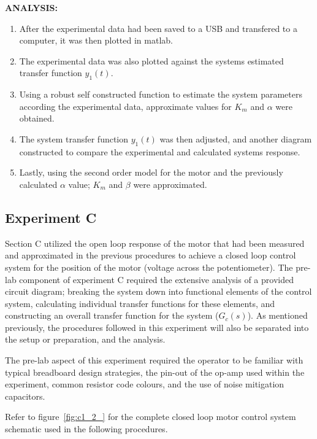 \documentclass[11pt,a4paper]{article}
\begin{document}
\textbf{ANALYSIS:}
\begin{enumerate}
  \item After the experimental data had been saved to a USB and transfered to a computer, it was then plotted in matlab.
  \item The experimental data was also plotted against the systems estimated transfer function $y_1(t)$. 
  \item Using a robust self constructed function to estimate the system parameters according the experimental data, approximate values for $K_m$ and $\alpha$ were obtained. 
  \item The system transfer function $y_1(t)$ was then adjusted, and another diagram constructed to compare the experimental and calculated systems response.
  \item Lastly, using the second order model for the motor and the previously calculated $\alpha$ value; $K_m$ and $\beta$ were approximated. 

\end{enumerate} 


\pagebreak
\subsection{Experiment C}
Section C utilized the open loop response of the motor that had been measured and approximated in the previous procedures to achieve a closed loop control system for the position of the motor (voltage across the potentiometer). The pre-lab component of experiment C required the extensive analysis of a provided circuit diagram; breaking the system down into functional elements of the control system, calculating individual transfer functions for these elements, and constructing an overall transfer function for the system ($G_c(s)$). As mentioned previously, the procedures followed in this experiment will also be separated into the setup or preparation, and the analysis. 

The pre-lab aspect of this experiment required the operator to be familiar with typical breadboard design strategies, the pin-out of the op-amp used within the experiment, common resistor code colours, and the use of noise mitigation capacitors. 

Refer to figure~\ref{fig:c1_2_} for the complete closed loop motor control system schematic used in the following procedures.\\
\end{document}
